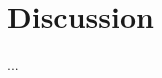 \documentclass[../../IO-Pixels.tex]{subfiles}
\begin{document}
\section{Discussion}
\begin{outline}
...
\end{outline}
\end{document}
